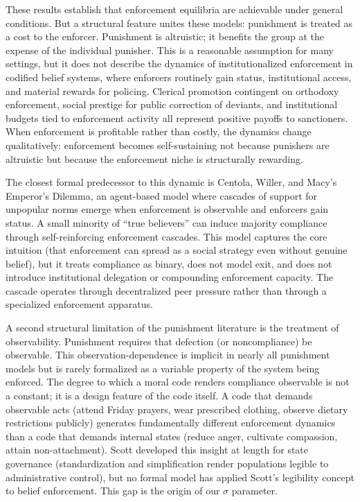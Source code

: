 \documentclass[12pt]{article}
\begin{document}
These results establish that enforcement equilibria are achievable under general conditions. But a structural feature unites these models: punishment is treated as a cost to the enforcer. Punishment is altruistic; it benefits the group at the expense of the individual punisher. This is a reasonable assumption for many settings, but it does not describe the dynamics of institutionalized enforcement in codified belief systems, where enforcers routinely gain status, institutional access, and material rewards for policing. Clerical promotion contingent on orthodoxy enforcement, social prestige for public correction of deviants, and institutional budgets tied to enforcement activity all represent positive payoffs to sanctioners. When enforcement is profitable rather than costly, the dynamics change qualitatively: enforcement becomes self-sustaining not because punishers are altruistic but because the enforcement niche is structurally rewarding.

The closest formal predecessor to this dynamic is Centola, Willer, and Macy's \cite{centola2005} Emperor's Dilemma, an agent-based model where cascades of support for unpopular norms emerge when enforcement is observable and enforcers gain status. A small minority of ``true believers'' can induce majority compliance through self-reinforcing enforcement cascades. This model captures the core intuition (that enforcement can spread as a social strategy even without genuine belief), but it treats compliance as binary, does not model exit, and does not introduce institutional delegation or compounding enforcement capacity. The cascade operates through decentralized peer pressure rather than through a specialized enforcement apparatus.

A second structural limitation of the punishment literature is the treatment of observability. Punishment requires that defection (or noncompliance) be observable. This observation-dependence is implicit in nearly all punishment models but is rarely formalized as a variable property of the system being enforced. The degree to which a moral code renders compliance observable is not a constant; it is a design feature of the code itself. A code that demands observable acts (attend Friday prayers, wear prescribed clothing, observe dietary restrictions publicly) generates fundamentally different enforcement dynamics than a code that demands internal states (reduce anger, cultivate compassion, attain non-attachment). Scott \cite{scott1998} developed this insight at length for state governance (standardization and simplification render populations legible to administrative control), but no formal model has applied Scott's legibility concept to belief enforcement. This gap is the origin of our $\sigma$ parameter.
\end{document}
